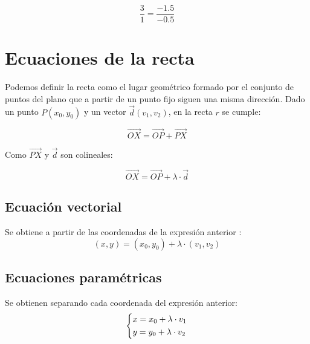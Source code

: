 $$\dfrac{3}{1}=\dfrac{-1.5}{-0.5}$$



\section{Ecuaciones de la recta}

Podemos definir la recta como el lugar geométrico formado por el conjunto de puntos del plano que a partir de un punto fijo siguen una misma dirección. Dado un punto $P(x_0,y_0)$ y un vector $\overrightarrow{d}(v_1,v_2)$, en la recta $r$ se cumple:


$$\overrightarrow{OX}=\overrightarrow{OP}+\overrightarrow{PX} $$ 

Como $\overrightarrow{PX}$ y $\overrightarrow{d}$ son colineales:

$$\overrightarrow{OX}=\overrightarrow{OP}+\lambda\cdot\overrightarrow{d} $$ 

\subsection{Ecuación vectorial}
Se obtiene a partir de las coordenadas de la expresión anterior :
$$(x,y)=(x_0,y_0)+\lambda\cdot(v_1,v_2)$$

\subsection{Ecuaciones paramétricas}
Se obtienen separando cada coordenada del expresión anterior:
$$\left\lbrace \begin{gathered}
  x = x_0 + \lambda\cdot v_1 \hfill \\
  y = y_0 + \lambda\cdot v_2 \hfill \\ 
\end{gathered}  \right.
$$
 
